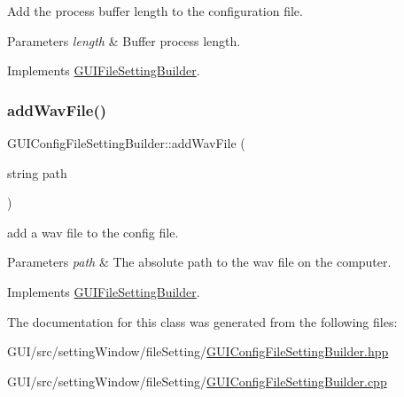 Add the process buffer length to the configuration file. 


\begin{DoxyParams}{Parameters}
{\em length} & Buffer process length. \\
\hline
\end{DoxyParams}


Implements \mbox{\hyperlink{class_g_u_i_file_setting_builder_a958259a35215b686477839872752a0dc}{G\+U\+I\+File\+Setting\+Builder}}.

\mbox{\label{class_g_u_i_config_file_setting_builder_a70e28ae5643efaec463e58b9bfc0d440}} 
\subsubsection{\texorpdfstring{add\+Wav\+File()}{addWavFile()}}
{\footnotesize\ttfamily G\+U\+I\+Config\+File\+Setting\+Builder\+::add\+Wav\+File (\begin{DoxyParamCaption}\item[{string}]{path }\end{DoxyParamCaption})\hspace{0.3cm}{\ttfamily [virtual]}}



add a wav file to the config file. 


\begin{DoxyParams}{Parameters}
{\em path} & The absolute path to the wav file on the computer. \\
\hline
\end{DoxyParams}


Implements \mbox{\hyperlink{class_g_u_i_file_setting_builder_ac18e732eac07a5d2e5146273d60e7655}{G\+U\+I\+File\+Setting\+Builder}}.



The documentation for this class was generated from the following files\+:\begin{DoxyCompactItemize}
\item 
G\+U\+I/src/setting\+Window/file\+Setting/\mbox{\hyperlink{_g_u_i_config_file_setting_builder_8hpp}{G\+U\+I\+Config\+File\+Setting\+Builder.\+hpp}}\item 
G\+U\+I/src/setting\+Window/file\+Setting/\mbox{\hyperlink{_g_u_i_config_file_setting_builder_8cpp}{G\+U\+I\+Config\+File\+Setting\+Builder.\+cpp}}\end{DoxyCompactItemize}
